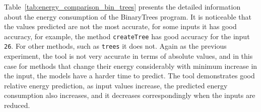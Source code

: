 Table~\ref{tab:energy_comparison_bin_trees} presents the detailed information about the energy consumption of the BinaryTrees program. It is noticeable that the values predicted are not the most accurate, for some inputs it has good accuracy, for example, the method \texttt{createTree} has good accuracy for the input \texttt{26}. For other methods, such as \texttt{trees} it does not. Again as the previous experiment, the tool is not very accurate in terms of absolute values, and in this case for methods that change their energy considerably with minimum increase in the input, the models have a harder time to predict. The tool demonstrates good relative energy prediction, as input values increase, the predicted energy consumption also increases, and it decreases correspondingly when the inputs are reduced.


\begin{table}[htbp]
  \centering
  \footnotesize
  \setlength{\tabcolsep}{10pt} %
\end{table}
